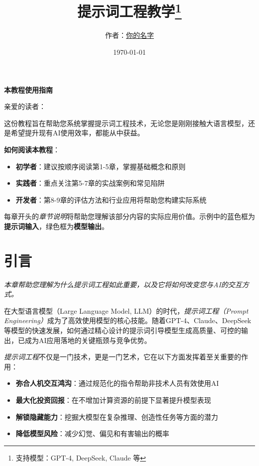 \documentclass[12pt]{ctexart}
\title{提示词工程教学\thanks{支持模型：GPT-4, DeepSeek, Claude 等}}
\author{作者：\href{mailto:you@example.com}{你的名字}}
\date{\today}
\newcommand{\chapternote}[1]{\vspace{-0.3cm}\par\noindent\textit{\small #1}\vspace{0.3cm}}
\begin{document}
\maketitle

\begin{center}
\large\textbf{本教程使用指南}
\end{center}

\noindent 亲爱的读者：

这份教程旨在帮助您系统掌握提示词工程技术，无论您是刚刚接触大语言模型，还是希望提升现有AI使用效率，都能从中获益。

\textbf{如何阅读本教程}：
\begin{itemize}
  \item \textbf{初学者}：建议按顺序阅读第1-5章，掌握基础概念和原则
  \item \textbf{实践者}：重点关注第5-7章的实战案例和常见陷阱
  \item \textbf{开发者}：第8-9章的评估方法和行业应用将帮助您构建实际系统
\end{itemize}

每章开头的\textit{章节说明}将帮助您理解该部分内容的实际应用价值。示例中的蓝色框为\textbf{提示词输入}，绿色框为\textbf{模型输出}。

\tableofcontents
\newpage

\section{引言}
\chapternote{本章帮助您理解为什么提示词工程如此重要，以及它将如何改变您与AI的交互方式。}

在大型语言模型（Large Language Model, LLM）的时代，\emph{提示词工程（Prompt Engineering）}成为了高效使用模型的核心技能。随着GPT-4、Claude、DeepSeek等模型的快速发展，如何通过精心设计的提示词引导模型生成高质量、可控的输出，已成为AI应用落地的关键瓶颈与竞争优势。

\emph{提示词工程}不仅是一门技术，更是一门艺术，它在以下方面发挥着至关重要的作用：
\begin{itemize}
  \item \textbf{弥合人机交互鸿沟}：通过规范化的指令帮助非技术人员有效使用AI
  \item \textbf{最大化投资回报}：在不增加计算资源的前提下显著提升模型表现
  \item \textbf{解锁隐藏能力}：挖掘大模型在复杂推理、创造性任务等方面的潜力
  \item \textbf{降低模型风险}：减少幻觉、偏见和有害输出的概率
\end{itemize}
\end{document}
